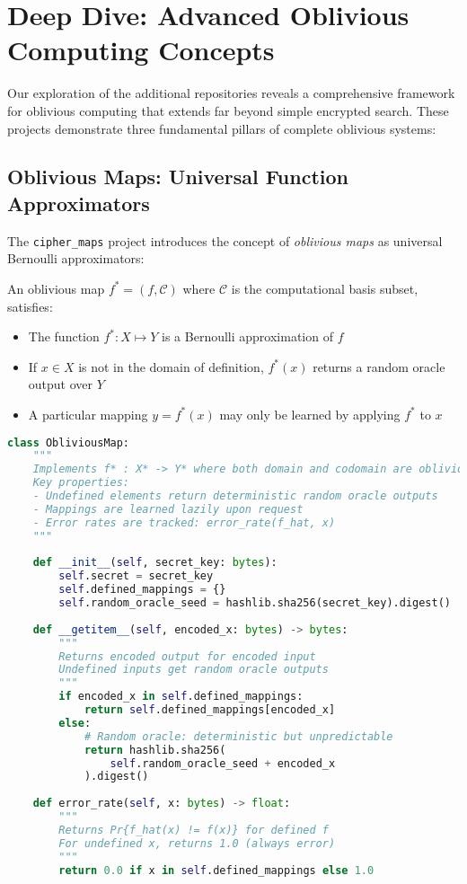 \section{Deep Dive: Advanced Oblivious Computing Concepts}
\label{sec:deep-dive-advanced}

Our exploration of the additional repositories reveals a comprehensive framework for oblivious computing that extends far beyond simple encrypted search. These projects demonstrate three fundamental pillars of complete oblivious systems:

\subsection{Oblivious Maps: Universal Function Approximators}

The \texttt{cipher\_maps} project introduces the concept of \textit{oblivious maps} as universal Bernoulli approximators:

\begin{definition}
An oblivious map $f^* = (f, \mathcal{C})$ where $\mathcal{C}$ is the computational basis subset, satisfies:
\begin{itemize}
\item The function $f^* : X \mapsto Y$ is a Bernoulli approximation of $f$
\item If $x \in X$ is not in the domain of definition, $f^*(x)$ returns a random oracle output over $Y$
\item A particular mapping $y = f^*(x)$ may only be learned by applying $f^*$ to $x$
\end{itemize}
\end{definition}

\begin{lstlisting}[language=Python, caption={Oblivious map with random oracle behavior}]
class ObliviousMap:
    """
    Implements f* : X* -> Y* where both domain and codomain are oblivious
    Key properties:
    - Undefined elements return deterministic random oracle outputs
    - Mappings are learned lazily upon request
    - Error rates are tracked: error_rate(f_hat, x)
    """
    
    def __init__(self, secret_key: bytes):
        self.secret = secret_key
        self.defined_mappings = {}
        self.random_oracle_seed = hashlib.sha256(secret_key).digest()
    
    def __getitem__(self, encoded_x: bytes) -> bytes:
        """
        Returns encoded output for encoded input
        Undefined inputs get random oracle outputs
        """
        if encoded_x in self.defined_mappings:
            return self.defined_mappings[encoded_x]
        else:
            # Random oracle: deterministic but unpredictable
            return hashlib.sha256(
                self.random_oracle_seed + encoded_x
            ).digest()
    
    def error_rate(self, x: bytes) -> float:
        """
        Returns Pr{f_hat(x) != f(x)} for defined f
        For undefined x, returns 1.0 (always error)
        """
        return 0.0 if x in self.defined_mappings else 1.0
\end{lstlisting}

